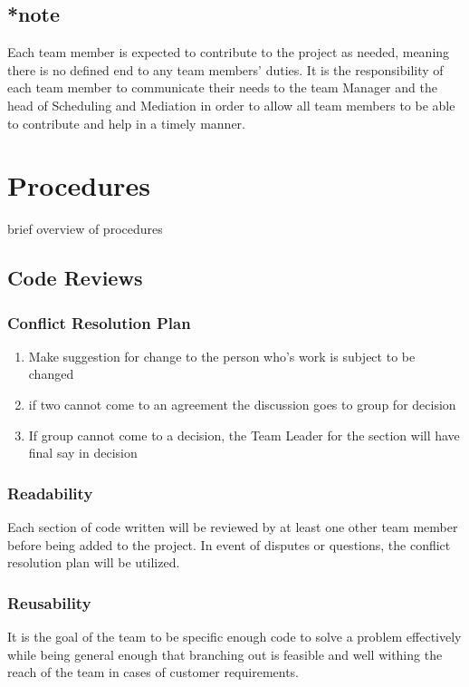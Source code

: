 \documentclass[11pt, titlepage]{article}
\begin{document}
     \subsection{*note}
     	Each team member is expected to contribute to the project as needed, meaning there is no defined end to any team members' duties.  It is the responsibility of each team member to communicate their needs to the team Manager and the head of Scheduling and Mediation in order to allow all team members to be able to contribute and help in a timely manner.
    \section{Procedures}
    	\tab brief overview of procedures
    \subsection{Code Reviews}
   		\subsubsection{Conflict Resolution Plan}
        
        \begin{enumerate}
		\item Make suggestion for change to the person who's work is subject to be 	changed
        \item if two cannot come to an agreement the discussion goes to group for 	decision
        \item If group cannot come to a decision, the Team Leader for the section will have final say in decision
		\end{enumerate}
    
    \subsubsection{Readability} 
	    Each section of code written will be reviewed by at least one other team member before being added to the project.  In event of disputes or questions, the conflict resolution plan will be utilized.
    \subsubsection{Reusability}
	    It is the goal of the team to be specific enough code to solve a problem effectively while being general enough that branching out is feasible and well withing the reach of the team in cases of customer requirements.
\end{document}
